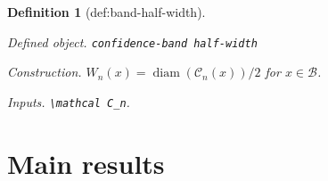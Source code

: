 \documentclass{article}
\newtheorem{definition}{Definition}
\begin{document}
\begin{definition}[def:band-half-width]\label{def:band-half-width}
\par\smallskip\noindent\emph{Defined object.} \texttt{confidence-\allowbreak{}band half-\allowbreak{}width}
\par\smallskip\noindent\emph{Construction.} \(W_n(x)=\operatorname{diam}(\mathcal C_n(x))/2\) for \(x\in\mathcal B\).
\par\smallskip\noindent\emph{Inputs.} \texttt{\textbackslash{}\allowbreak{}mathcal C\_\allowbreak{}n}.
\end{definition}

\section{Main results}
\end{document}
